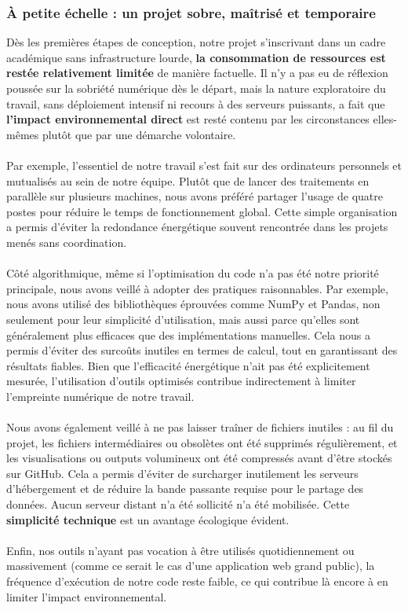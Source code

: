 \documentclass[12pt]{article}
\begin{document}
\subsubsection*{À petite échelle : un projet sobre, maîtrisé et temporaire}
Dès les premières étapes de conception, notre projet s’inscrivant dans un cadre académique sans infrastructure lourde, \textbf{la consommation de ressources est restée relativement limitée} de manière factuelle. Il n’y a pas eu de réflexion poussée sur la sobriété numérique dès le départ, mais la nature exploratoire du travail, sans déploiement intensif ni recours à des serveurs puissants, a fait que \textbf{l’impact environnemental direct} est resté contenu par les circonstances elles-mêmes plutôt que par une démarche volontaire.\\
\\
Par exemple, l’essentiel de notre travail s’est fait sur des ordinateurs personnels et mutualisés au sein de notre équipe. Plutôt que de lancer des traitements en parallèle sur plusieurs machines, nous avons préféré partager l’usage de quatre postes pour réduire le temps de fonctionnement global. Cette simple organisation a permis d’éviter la redondance énergétique souvent rencontrée dans les projets menés sans coordination.\\
\\
Côté algorithmique, même si l’optimisation du code n’a pas été notre priorité principale, nous avons veillé à adopter des pratiques raisonnables. Par exemple, nous avons utilisé des bibliothèques éprouvées comme NumPy et Pandas, non seulement pour leur simplicité d’utilisation, mais aussi parce qu’elles sont généralement plus efficaces que des implémentations manuelles. Cela nous a permis d’éviter des surcoûts inutiles en termes de calcul, tout en garantissant des résultats fiables. Bien que l’efficacité énergétique n’ait pas été explicitement mesurée, l’utilisation d’outils optimisés contribue indirectement à limiter l’empreinte numérique de notre travail.\\
\\
Nous avons également veillé à ne pas laisser traîner de fichiers inutiles : au fil du projet, les fichiers intermédiaires ou obsolètes ont été supprimés régulièrement, et les visualisations ou outputs volumineux ont été compressés avant d’être stockés sur GitHub. Cela a permis d’éviter de surcharger inutilement les serveurs d’hébergement et de réduire la bande passante requise pour le partage des données. Aucun serveur distant n’a été sollicité n’a été mobilisée. Cette \textbf{simplicité technique} est un avantage écologique évident.\\
\\
Enfin, nos outils n’ayant pas vocation à être utilisés quotidiennement ou massivement (comme ce serait le cas d’une application web grand public), la fréquence d’exécution de notre code reste faible, ce qui contribue là encore à en limiter l’impact environnemental.
\end{document}
